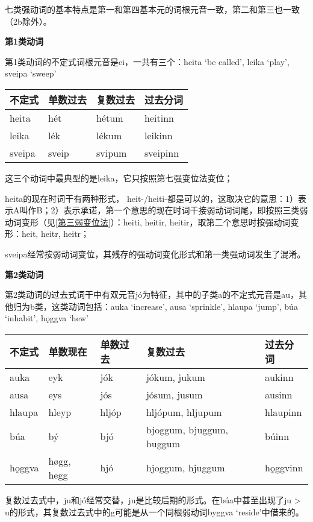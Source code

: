 七类强动词的基本特点是第一和第四基本元的词根元音一致，第二和第三也一致（2b除外）。

\textbf{第1类动词}

第1类动词的不定式词根元音是ei，一共有三个：heita `be called', leika
`play', sveipa `sweep'

\begin{longtable}{llll}
  \toprule
  不定式 & 单数过去 & 复数过去 & 过去分词 \\
  \midrule
  \endhead
  \bottomrule
  \endfoot
  heita  & hét      & hétum    & heitinn  \\
  leika  & lék      & lékum    & leikinn  \\
  sveipa & sveip    & svipum   & sveipinn \\
\end{longtable}

这三个动词中最典型的是leika，它只按照第七强变位法变位；

heita的现在时词干有两种形式，
heit-/heiti-都是可以的，这取决它的意思：1）表示A叫作B；2）表示承诺，第一个意思的现在时词干接弱动词词尾，即按照三类弱动词变形（见\ref{第三弱变位法}）：heiti,
heitir, heitir，取第二个意思时按强动词变形：heit, heitr, heitr；

sveipa经常按弱动词变位，其残存的强动词变化形式和第一类强动词发生了混淆。

\textbf{第2类动词}

第2类动词的过去式词干中有双元音jó为特征，其中的子类a的不定式元音是au，其他归为b类，这类动词包括：auka
`increase', ausa `sprinkle', hlaupa `jump', búa `inhabit', hǫggva `hew‌'

\begin{longtable}{lllll}
  \toprule
  不定式 & 单数现在   & 单数过去 & 复数过去                 & 过去分词 \\
  \midrule
  \endhead
  \bottomrule
  \endfoot
  auka   & eyk        & jók      & jókum, jukum             & aukinn   \\
  ausa   & eys        & jós      & jósum, jusum             & ausinn   \\
  hlaupa & hleyp      & hljóp    & hljópum, hljupum         & hlaupinn \\
  búa    & bý         & bjó      & bjoggum, bjuggum, buggum & búinn    \\
  hǫggva & høgg, hegg & hjó      & hjoggum, hjuggum         & hǫggvinn \\
\end{longtable}

复数过去式中，ju和jó经常交替，ju是比较后期的形式。在búa中甚至出现了ju
\textgreater{} u的形式，其复数过去式中的g可能是从一个同根弱动词byggva
`reside'中借来的。

